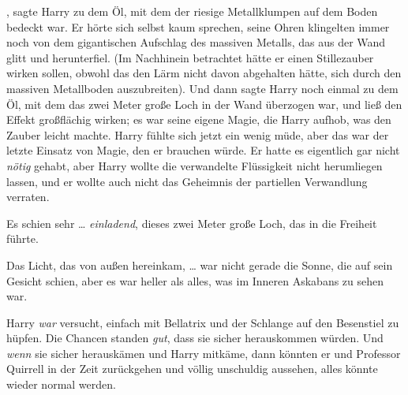 , sagte Harry zu dem Öl, mit dem der riesige Metallklumpen auf dem Boden bedeckt war. Er hörte sich selbst kaum sprechen, seine Ohren klingelten immer noch von dem gigantischen Aufschlag des massiven Metalls, das aus der Wand glitt und herunterfiel. (Im Nachhinein betrachtet hätte er einen Stillezauber wirken sollen, obwohl das den Lärm nicht davon abgehalten hätte, sich durch den massiven Metallboden auszubreiten). Und dann sagte Harry noch einmal  zu dem Öl, mit dem das zwei Meter große Loch in der Wand überzogen war, und ließ den Effekt großflächig wirken; es war seine eigene Magie, die Harry aufhob, was den Zauber leicht machte. Harry fühlte sich jetzt ein wenig müde, aber das war der letzte Einsatz von Magie, den er brauchen würde. Er hatte es eigentlich gar nicht \emph{nötig} gehabt, aber Harry wollte die verwandelte Flüssigkeit nicht herumliegen lassen, und er wollte auch nicht das Geheimnis der partiellen Verwandlung verraten.

Es schien sehr … \emph{einladend}, dieses zwei Meter große Loch, das in die Freiheit führte.

Das Licht, das von außen hereinkam, … war nicht gerade die Sonne, die auf sein Gesicht schien, aber es war heller als alles, was im Inneren Askabans zu sehen war.

Harry \emph{war} versucht, einfach mit Bellatrix und der Schlange auf den Besenstiel zu hüpfen. Die Chancen standen \emph{gut}, dass sie sicher herauskommen würden. Und \emph{wenn} sie sicher herauskämen und Harry mitkäme, dann könnten er und Professor Quirrell in der Zeit zurückgehen und völlig unschuldig aussehen, alles könnte wieder normal werden.

